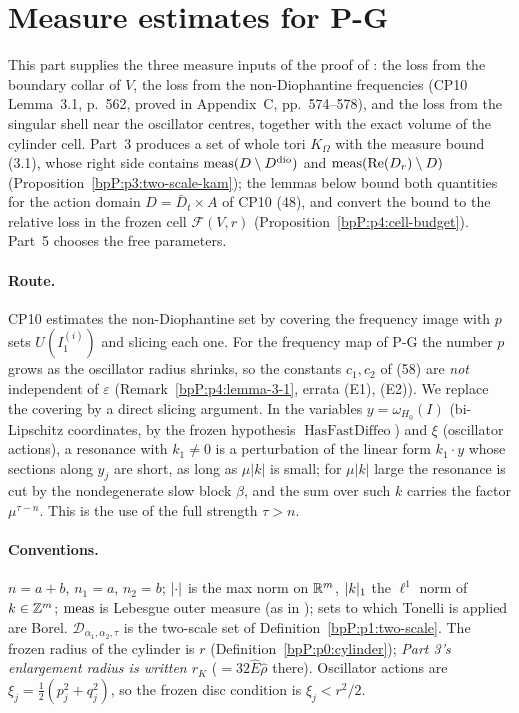 \section{Measure estimates for P-G}\label{bpP:p4}

This part supplies the three measure inputs of the proof of : the loss from the boundary collar of $V$, the loss from the non-Diophantine frequencies (CP10 Lemma~3.1, p.~562, proved in Appendix~C, pp.~574--578), and the loss from the singular shell near the oscillator centres, together with the exact volume of the cylinder cell. Part~3 produces a set of whole tori $K_\Omega$ with the measure bound (3.1), whose right side contains $\operatorname{meas}(D\setminus D^{\rm dio})$ and $\operatorname{meas}(\operatorname{Re}(D_{r})\setminus D)$ (Proposition~\ref{bpP:p3:two-scale-kam}); the lemmas below bound both quantities for the action domain $D=\bar D_t\times A$ of CP10 (48), and convert the bound to the relative loss in the frozen cell $\mathcal F(V,r)$ (Proposition~\ref{bpP:p4:cell-budget}). Part~5 chooses the free parameters.

\paragraph{Route.} CP10 estimates the non-Diophantine set by covering the frequency image with $p$ sets $U(I_1^{(i)})$ and slicing each one. For the frequency map of P-G the number $p$ grows as the oscillator radius shrinks, so the constants $c_1,c_2$ of (58) are \emph{not} independent of $\varepsilon$ (Remark~\ref{bpP:p4:lemma-3-1}, errata (E1), (E2)). We replace the covering by a direct slicing argument. In the variables $y=\omega_{H_0}(I)$ (bi-Lipschitz coordinates, by the frozen hypothesis $\operatorname{HasFastDiffeo}$) and $\xi$ (oscillator actions), a resonance with $k_1\ne0$ is a perturbation of the linear form $k_1\cdot y$ whose sections along $y_j$ are short, as long as $\mu|k|$ is small; for $\mu|k|$ large the resonance is cut by the nondegenerate slow block $\beta$, and the sum over such $k$ carries the factor $\mu^{\tau-n}$. This is the use of the full strength $\tau>n$.

\paragraph{Conventions.} $n=a+b$, $n_1=a$, $n_2=b$; $\lvert \cdot\rvert$ is the max norm on $\mathbb{R}^m$, $\lvert k\rvert_1$ the $\ell^1$ norm of $k\in\mathbb{Z}^m$; $\operatorname{meas}$ is Lebesgue outer measure (as in ); sets to which Tonelli is applied are Borel. $\mathcal D_{\alpha_1,\alpha_2,\tau}$ is the two-scale set of Definition~\ref{bpP:p1:two-scale}. The frozen radius of the cylinder is $r$ (Definition~\ref{bpP:p0:cylinder}); \emph{Part 3's enlargement radius is written $r_K$} ($=32\hat E\hat\rho$ there). Oscillator actions are $\xi_j=\tfrac12(p_j^2+q_j^2)$, so the frozen disc condition is $\xi_j<r^2/2$.

